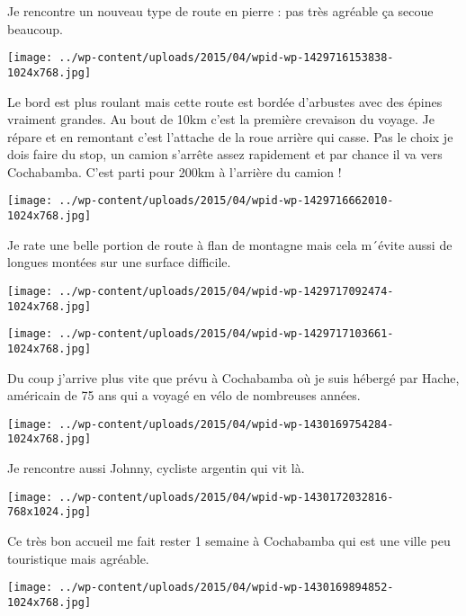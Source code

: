  Je rencontre un nouveau type de route en pierre : pas très agréable ça secoue beaucoup. \newline
 \newline
\centerline{\texttt{[image: ../wp-content/uploads/2015/04/wpid-wp-1429716153838-1024x768.jpg]} } 
 \newline
 Le bord est plus roulant mais cette route est bordée d'arbustes avec des épines vraiment grandes. Au bout de 10km c'est la première crevaison du voyage. Je répare et en remontant c'est l'attache de la roue arrière qui casse. \newline
 Pas le choix je dois faire du stop, un camion s'arrête assez rapidement et par chance il va vers Cochabamba. C'est parti pour 200km à l'arrière du camion ! \newline
 \newline
\centerline{\texttt{[image: ../wp-content/uploads/2015/04/wpid-wp-1429716662010-1024x768.jpg]} } 
 \newline
 Je rate une belle portion de route à flan de montagne mais cela m´évite aussi de longues montées sur une surface difficile. \newline
 \newline
\centerline{\texttt{[image: ../wp-content/uploads/2015/04/wpid-wp-1429717092474-1024x768.jpg]} } 
 \newline
 \newline
\centerline{\texttt{[image: ../wp-content/uploads/2015/04/wpid-wp-1429717103661-1024x768.jpg]} } 
 \newline
 Du coup j'arrive plus vite que prévu à Cochabamba où je suis hébergé par Hache, américain de 75 ans qui a voyagé en vélo de nombreuses années. \newline
 \newline
\centerline{\texttt{[image: ../wp-content/uploads/2015/04/wpid-wp-1430169754284-1024x768.jpg]} } 
 \newline
 Je rencontre aussi Johnny, cycliste argentin qui vit là. \newline
 \newline
\centerline{\texttt{[image: ../wp-content/uploads/2015/04/wpid-wp-1430172032816-768x1024.jpg]} } 
 \newline
 Ce très bon accueil me fait rester 1 semaine à Cochabamba qui est une ville peu touristique mais agréable. \newline
 \newline
\centerline{\texttt{[image: ../wp-content/uploads/2015/04/wpid-wp-1430169894852-1024x768.jpg]} } 
